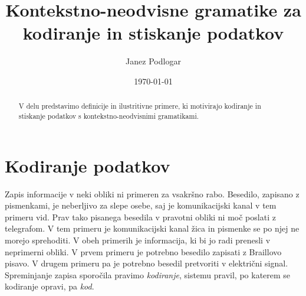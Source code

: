 \documentclass{amsart}
\title{Kontekstno-neodvisne gramatike za kodiranje in stiskanje podatkov}
\author{Janez Podlogar}
\date{\today}
\theoremstyle{definition} %
\theoremstyle{plain} %
\begin{document}
\begin{abstract}

    V delu predstavimo definicije in ilustritivne primere, ki motivirajo kodiranje in
    stiskanje podatkov s kontekstno-neodvisnimi gramatikami.

\end{abstract}

\maketitle

\section{Kodiranje podatkov}

Zapis informacije v neki obliki ni primeren za vsakršno rabo. Besedilo, zapisano z 
pismenkami, je neberljivo za slepe osebe, saj je komunikacijski kanal v tem primeru
vid. Prav tako pisanega besedila v pravotni obliki ni moč poslati z telegrafom. V tem
primeru je komunikacijski kanal žica in pismenke se po njej ne morejo sprehoditi. V obeh 
primerih je informacija, ki bi jo radi prenesli v neprimerni obliki. V prvem 
primeru je potrebno besedilo zapisati z Braillovo pisavo. V drugem primeru pa je 
potrebno besedil pretvoriti v električni signal. Spreminjanje zapisa sporočila
pravimo \textit{kodiranje}, sistemu pravil, po katerem se kodiranje opravi,
pa \textit{kod}. 
\end{document}
